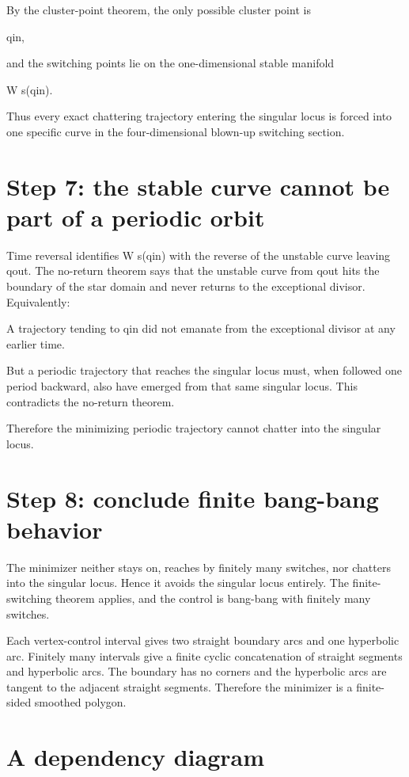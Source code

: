 By the cluster-point theorem, the only possible cluster point is


qin,


and the switching points lie on the one-dimensional stable manifold


W s(qin).


Thus every exact chattering trajectory entering the singular locus is forced into one specific curve in the four-dimensional blown-up switching section.


\section{Step 7: the stable curve cannot be part of a periodic orbit}

Time reversal identifies W s(qin) with the reverse of the unstable curve leaving qout. The no-return theorem says that the unstable curve from qout hits the boundary of the star domain and never returns to the exceptional divisor. Equivalently:


A trajectory tending to qin did not emanate from the exceptional divisor at any earlier time.


But a periodic trajectory that reaches the singular locus must, when followed one period backward, also have emerged from that same singular locus. This contradicts the no-return theorem.


Therefore the minimizing periodic trajectory cannot chatter into the singular locus.


\section{Step 8: conclude finite bang-bang behavior}

The minimizer neither stays on, reaches by finitely many switches, nor chatters into the singular locus. Hence it avoids the singular locus entirely. The finite-switching theorem applies, and the control is bang-bang with finitely many switches.


Each vertex-control interval gives two straight boundary arcs and one hyperbolic arc. Finitely many intervals give a finite cyclic concatenation of straight segments and hyperbolic arcs. The boundary has no corners and the hyperbolic arcs are tangent to the adjacent straight segments. Therefore the minimizer is a finite-sided smoothed polygon.


\section{A dependency diagram}

